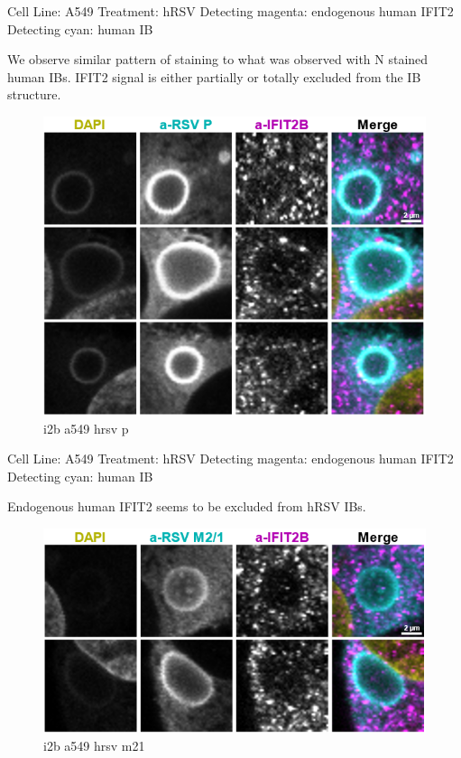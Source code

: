 Cell Line: A549 \newline
Treatment: hRSV \newline
Detecting magenta: endogenous human IFIT2  \newline
Detecting cyan: human IB  \newline

We observe similar pattern of staining to what was observed with N stained human IBs. IFIT2 signal is either partially or totally excluded from the IB structure.

\begin{figure}
    \centering
    \includegraphics[width=1\linewidth]{10. Chapter 5/Figs/01. Infection/05. i2b a549 hrsv p.png}
    \caption[i2b a549 hrsv p]{i2b a549 hrsv p}
    \label{fig:i2b a549 hrsv p}
\end{figure}

Cell Line: A549 \newline
Treatment: hRSV \newline
Detecting magenta: endogenous human IFIT2  \newline
Detecting cyan: human IB \newline

Endogenous human IFIT2 seems to be excluded from hRSV IBs.

\begin{figure}
    \centering
    \includegraphics[width=1\linewidth]{10. Chapter 5/Figs/01. Infection/06. i2b a549 hrsv m21.png}
    \caption[i2b a549 hrsv m21]{i2b a549 hrsv m21}
    \label{fig:i2b a549 hrsv m21}
\end{figure}

